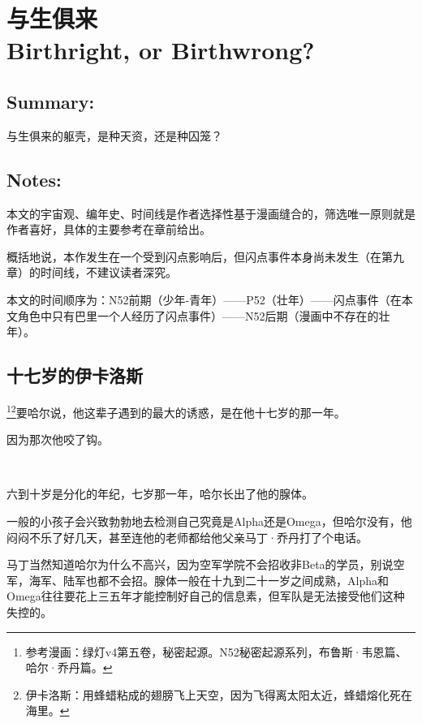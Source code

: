\documentclass[../main]{subfiles}
\begin{document}
\pagestyle{mystyle}

\vspace{200em}

\chapter[与生俱来]{与生俱来 \\ Birthright, or Birthwrong?}
\vspace{3cm}


\section*{Summary:}

与生俱来的躯壳，是种天资，还是种囚笼？

\section*{Notes:}

本文的宇宙观、编年史、时间线是作者选择性基于漫画缝合的，筛选唯一原则就是作者喜好，具体的主要参考在章前给出。

概括地说，本作发生在一个受到闪点影响后，但闪点事件本身尚未发生（在第九章）的时间线，不建议读者深究。

本文的时间顺序为：N52前期（少年-青年）——P52（壮年）——闪点事件（在本文角色中只有巴里一个人经历了闪点事件）——N52后期（漫画中不存在的壮年）。

\newpage

\section{十七岁的伊卡洛斯}

\footnote[1]{参考漫画：绿灯v4第五卷，秘密起源。N52秘密起源系列，布鲁斯·韦恩篇、哈尔·乔丹篇。}\footnote[2]{伊卡洛斯：用蜂蜡粘成的翅膀飞上天空，因为飞得离太阳太近，蜂蜡熔化死在海里。}要哈尔说，他这辈子遇到的最大的诱惑，是在他十七岁的那一年。

因为那次他咬了钩。

~\

六到十岁是分化的年纪，七岁那一年，哈尔长出了他的腺体。

一般的小孩子会兴致勃勃地去检测自己究竟是Alpha还是Omega，但哈尔没有，他闷闷不乐了好几天，甚至连他的老师都给他父亲马丁·乔丹打了个电话。

马丁当然知道哈尔为什么不高兴，因为空军学院不会招收非Beta的学员，别说空军，海军、陆军也都不会招。腺体一般在十九到二十一岁之间成熟，Alpha和Omega往往要花上三五年才能控制好自己的信息素，但军队是无法接受他们这种失控的。
\end{document}
